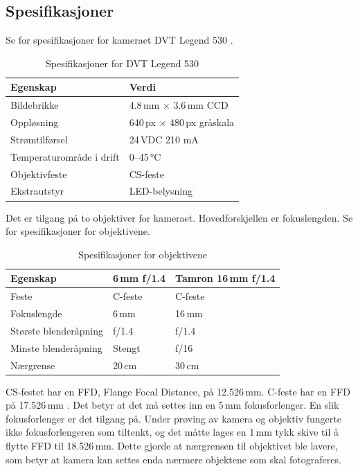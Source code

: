 \documentclass[Visionprosjekt.tex]{subfiles}
\begin{document}
\subsection{Spesifikasjoner}
Se  for spesifikasjoner for kameraet DVT Legend 530 \cite{dvtlegend530}.

\begin{table}[ht]
    \centering
    \caption{Spesifikasjoner for DVT Legend 530}
    \label{tab:legend530}
    \begin{tabularx}{0.65\textwidth}{lX}
    \toprule
        Egenskap        &   Verdi\\
    \midrule
        Bildebrikke	    &	4.8\,mm $\times$ 3.6\,mm CCD\\
        Oppløsning	    &	640\,px $\times$ 480\,px gråskala\\
        Strømtilførsel	&	24\,VDC 210 mA\\
        Temperaturområde i drift	&	0--45\,°C\\
        Objektivfeste	&	CS-feste\\
        Ekstrautstyr	&	LED-belysning\\
        \bottomrule
    \end{tabularx}
\end{table}

Det er tilgang på to objektiver for kameraet. Hovedforskjellen er fokuslengden. Se  for spesifikasjoner for objektivene.



\begin{table}[ht]
    \centering
    \caption{Spesifikasjoner for objektivene}
    \label{tab:objektiver}
    \begin{tabularx}{0.65\textwidth}{llX}
        \toprule
         Egenskap               &	6\,mm f/1.4	&	Tamron 16\,mm f/1.4\\
        \midrule
        Feste	                &	C-feste	    &	C-feste\\
        Fokuslengde	            &	6\,mm	    &	16\,mm\\
        Største blenderåpning	&	f/1.4	    &	f/1.4\\
        Minste blenderåpning	&	Stengt	    &	f/16\\
        Nærgrense	            &	20\,cm	    &	30\,cm\\
        \bottomrule
    \end{tabularx}
\end{table}


CS-festet har en FFD, Flange Focal Distance, på 12.526\,mm. C-feste har en FFD på 17.526\,mm \cite{CSmount}. Det betyr at det må settes inn en 5\,mm fokusforlenger. En slik fokusforlenger er det tilgang på. Under prøving av kamera og objektiv fungerte ikke fokusforlengeren som tiltenkt, og det måtte lages en 1\,mm tykk skive til å flytte FFD til 18.526\,mm. Dette gjorde at nærgrensen til objektivet ble lavere, som betyr at kamera kan settes enda nærmere objektene som skal fotograferes.
\end{document}
